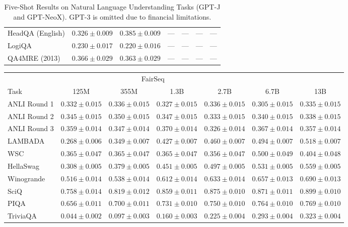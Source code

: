 \documentclass[11pt]{article}
\begin{document}
{\begin{landscape}
\begin{table}
\begin{tabular}{l c c c c c c }
HeadQA (English) & $0.326 \pm 0.009$ & $0.385 \pm 0.009$ & ---  & --- & --- & --- \\ 
LogiQA & $0.230 \pm 0.017$ & $0.220 \pm 0.016$ & ---  & --- & --- & --- \\ 
QA4MRE (2013) & $0.366 \pm 0.029$ & $0.363 \pm 0.029$ & ---  & --- & --- & --- \\ 
\bottomrule 
\end{tabular}
\caption{Five-Shot Results on Natural Language Understanding Tasks (GPT-J and GPT-NeoX). GPT-3 is omitted due to financial limitations.}
\label{tab:nlu_gpt_5}
\end{table}

\begin{table}
\centering 
\begin{tabular}{l c c c c c c } \\ 
& \multicolumn{4}{c}{FairSeq} \\ 
Task & 125M & 355M & 1.3B & 2.7B & 6.7B & 13B \\ \toprule
ANLI Round 1 & $0.332 \pm 0.015$ & $0.336 \pm 0.015$ & $0.327 \pm 0.015$ & $0.336 \pm 0.015$ & $0.305 \pm 0.015$ & $0.335 \pm 0.015$ \\ 
ANLI Round 2 & $0.345 \pm 0.015$ & $0.350 \pm 0.015$ & $0.347 \pm 0.015$ & $0.333 \pm 0.015$ & $0.340 \pm 0.015$ & $0.338 \pm 0.015$ \\ 
ANLI Round 3 & $0.359 \pm 0.014$ & $0.347 \pm 0.014$ & $0.370 \pm 0.014$ & $0.326 \pm 0.014$ & $0.367 \pm 0.014$ & $0.357 \pm 0.014$ \\ 
LAMBADA & $0.268 \pm 0.006$ & $0.349 \pm 0.007$ & $0.427 \pm 0.007$ & $0.460 \pm 0.007$ & $0.494 \pm 0.007$ & $0.518 \pm 0.007$ \\ 
WSC & $0.365 \pm 0.047$ & $0.365 \pm 0.047$ & $0.365 \pm 0.047$ & $0.356 \pm 0.047$ & $0.500 \pm 0.049$ & $0.404 \pm 0.048$ \\ 
HellaSwag & $0.308 \pm 0.005$ & $0.379 \pm 0.005$ & $0.451 \pm 0.005$ & $0.497 \pm 0.005$ & $0.531 \pm 0.005$ & $0.559 \pm 0.005$ \\ 
Winogrande & $0.516 \pm 0.014$ & $0.538 \pm 0.014$ & $0.612 \pm 0.014$ & $0.633 \pm 0.014$ & $0.657 \pm 0.013$ & $0.690 \pm 0.013$ \\ 
SciQ & $0.758 \pm 0.014$ & $0.819 \pm 0.012$ & $0.859 \pm 0.011$ & $0.875 \pm 0.010$ & $0.871 \pm 0.011$ & $0.899 \pm 0.010$ \\ 
PIQA & $0.656 \pm 0.011$ & $0.700 \pm 0.011$ & $0.731 \pm 0.010$ & $0.750 \pm 0.010$ & $0.764 \pm 0.010$ & $0.769 \pm 0.010$ \\ 
TriviaQA & $0.044 \pm 0.002$ & $0.097 \pm 0.003$ & $0.160 \pm 0.003$ & $0.225 \pm 0.004$ & $0.293 \pm 0.004$ & $0.323 \pm 0.004$ \\ 

\end{tabular}
\end{table}
\end{landscape}}
\end{document}
